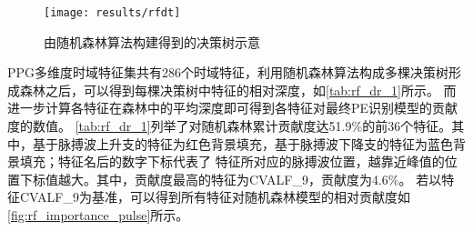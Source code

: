 \begin{figure}[htbp]
      \centering
      \texttt{[image: results/rfdt]}
      \caption{\label{fig:dt_clf}由随机森林算法构建得到的决策树示意}
\end{figure}

PPG多维度时域特征集共有286个时域特征，利用随机森林算法构成多棵决策树形成森林之后，可以得到每棵决策树中特征的相对深度，如\autoref{tab:rf_dr_1}所示。
而进一步计算各特征在森林中的平均深度即可得到各特征对最终PE识别模型的贡献度的数值。
\autoref{tab:rf_dr_1}列举了对随机森林累计贡献度达51.9\%的前36个特征。其中，基于脉搏波上升支的特征为红色背景填充，基于脉搏波下降支的特征为蓝色背景填充；特征名后的数字下标代表了
特征所对应的脉搏波位置，越靠近峰值的位置下标值越大。其中，贡献度最高的特征为CVALF\_9，贡献度为4.6\%。
若以特征CVALF\_9为基准，可以得到所有特征对随机森林模型的相对贡献度如\autoref{fig:rf_importance_pulse}所示。

